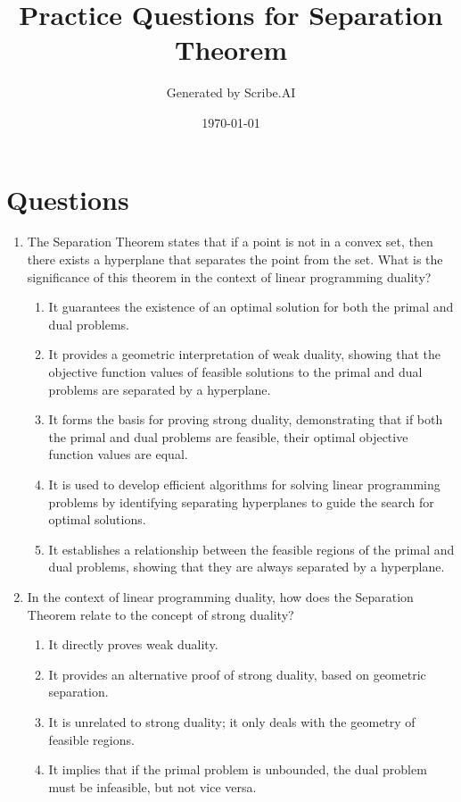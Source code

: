 \documentclass{article}%
\title{Practice Questions for Separation Theorem}%
\author{Generated by Scribe.AI}%
\date{\today}%
\begin{document}
%
\normalsize%
\maketitle%
\section{Questions}%
\label{sec:Questions}%
\begin{enumerate}%
\item The Separation Theorem states that if a point is not in a convex set, then there exists a hyperplane that separates the point from the set.  What is the significance of this theorem in the context of linear programming duality?%
\begin{enumerate}%
\item It guarantees the existence of an optimal solution for both the primal and dual problems.%
\item It provides a geometric interpretation of weak duality, showing that the objective function values of feasible solutions to the primal and dual problems are separated by a hyperplane.%
\item It forms the basis for proving strong duality, demonstrating that if both the primal and dual problems are feasible, their optimal objective function values are equal.%
\item It is used to develop efficient algorithms for solving linear programming problems by identifying separating hyperplanes to guide the search for optimal solutions.%
\item It establishes a relationship between the feasible regions of the primal and dual problems, showing that they are always separated by a hyperplane.%
\end{enumerate}%
\vspace{1em}%
\item In the context of linear programming duality, how does the Separation Theorem relate to the concept of strong duality?%
\begin{enumerate}%
\item It directly proves weak duality.%
\item It provides an alternative proof of strong duality, based on geometric separation.%
\item It is unrelated to strong duality; it only deals with the geometry of feasible regions.%
\item It implies that if the primal problem is unbounded, the dual problem must be infeasible, but not vice versa.%

\end{enumerate}
\end{enumerate}
\end{document}

